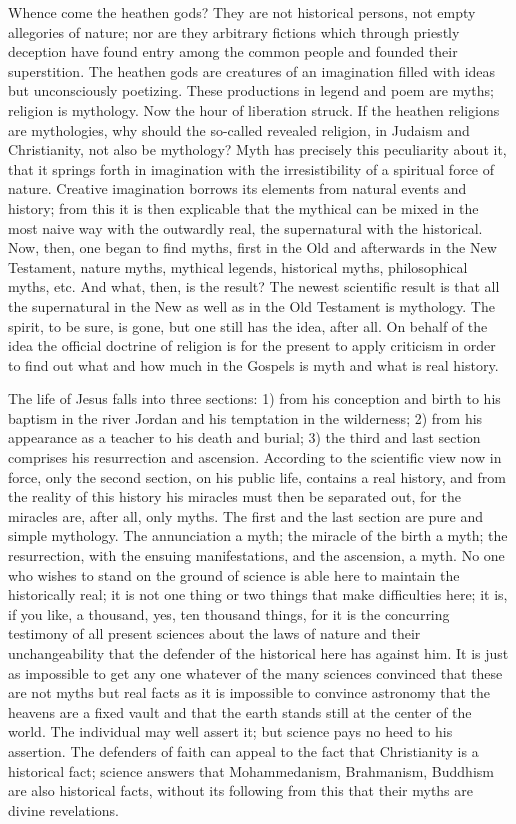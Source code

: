 \documentclass[12pt,a4paper,openany]{book}
\newcommand{\opage}[1]{\marginnote{\footnotesize\textit{[#1]}}}
\begin{document}
Whence come the heathen gods? They are not historical persons, not empty allegories of nature; nor are they arbitrary fictions which through priestly deception have found entry among the common people and founded their superstition. The heathen gods are creatures of an imagination filled with ideas but unconsciously poetizing. These productions in legend and poem are myths; religion is mythology. Now the hour of liberation struck. If the heathen religions are mythologies, why should the so-called revealed religion, in Judaism and Christianity, not also be mythology? Myth has precisely this peculiarity about it, that it springs forth in imagination with the irresistibility of a spiritual force of nature. Creative imagination borrows its elements from natural events and history; from this it is then explicable that the mythical can be mixed in the most naive way with the outwardly real, the supernatural with the historical. Now, then, one began to find myths, first in the Old and afterwards in the New Testament, nature myths, mythical legends, historical myths, philosophical myths, etc. And what, then, is the result? The newest scientific result is that all the supernatural in the New as well as in the Old Testament is mythology. The spirit, to be sure, is
\setcounter{footnote}{0}%
\opage{36}gone, but one still has the idea, after all. On behalf of the idea the official doctrine of religion is for the present to apply criticism in order to find out what and how much in the Gospels is myth and what is real history.

The life of Jesus falls into three sections: 1) from his conception and birth to his baptism in the river Jordan and his temptation in the wilderness; 2) from his appearance as a teacher to his death and burial; 3) the third and last section comprises his resurrection and ascension. According to the scientific view now in force, only the second section, on his public life, contains a real history, and from the reality of this history his miracles must then be separated out, for the miracles are, after all, only myths. The first and the last section are pure and simple mythology. The annunciation a myth; the miracle of the birth a myth; the resurrection, with the ensuing manifestations, and the ascension, a myth. No one who wishes to stand on the ground of science is able here to maintain the historically real; it is not one thing or two things that make difficulties here; it is, if you like, a thousand, yes, ten thousand things, for it is the concurring testimony of all present sciences about the laws of nature and their unchangeability that the defender of the historical here has against him. It is just as impossible to get any one whatever of the many sciences convinced that these are not myths but real facts as it is impossible to convince astronomy that the heavens are a fixed vault and that the earth stands still at the center of the world. The individual may well assert it; but science pays no heed to his assertion. The defenders of faith can appeal to the fact that Christianity is a historical fact; science answers that
\setcounter{footnote}{0}%
\opage{37}Mohammedanism, Brahmanism, Buddhism are also historical facts, without its following from this that their myths are divine revelations.
\end{document}
